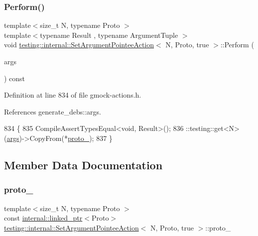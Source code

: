 \subsubsection{\texorpdfstring{Perform()}{Perform()}}
{\footnotesize\ttfamily template$<$size\+\_\+t N, typename Proto $>$ \\
template$<$typename Result , typename Argument\+Tuple $>$ \\
void \hyperlink{classtesting_1_1internal_1_1SetArgumentPointeeAction}{testing\+::internal\+::\+Set\+Argument\+Pointee\+Action}$<$ N, Proto, true $>$\+::Perform (\begin{DoxyParamCaption}\item[{const Argument\+Tuple \&}]{args }\end{DoxyParamCaption}) const\hspace{0.3cm}{\ttfamily [inline]}}



Definition at line 834 of file gmock-\/actions.\+h.



References generate\+\_\+debs\+::args.


\begin{DoxyCode}
834                                                 \{
835     CompileAssertTypesEqual<void, Result>();
836     ::testing::get<N>(\hyperlink{namespacegenerate__debs_a75f9143e38df82d83b2e8a6f99cae02c}{args})->CopyFrom(*\hyperlink{classtesting_1_1internal_1_1SetArgumentPointeeAction_3_01N_00_01Proto_00_01true_01_4_aef9287aad8516bfec6cbcf63807c6c87}{proto\_});
837   \}
\end{DoxyCode}


\subsection{Member Data Documentation}
\mbox{\label{classtesting_1_1internal_1_1SetArgumentPointeeAction_3_01N_00_01Proto_00_01true_01_4_aef9287aad8516bfec6cbcf63807c6c87}} 
\subsubsection{\texorpdfstring{proto\+\_\+}{proto\_}}
{\footnotesize\ttfamily template$<$size\+\_\+t N, typename Proto $>$ \\
const \hyperlink{classtesting_1_1internal_1_1linked__ptr}{internal\+::linked\+\_\+ptr}$<$Proto$>$ \hyperlink{classtesting_1_1internal_1_1SetArgumentPointeeAction}{testing\+::internal\+::\+Set\+Argument\+Pointee\+Action}$<$ N, Proto, true $>$\+::proto\+\_\+\hspace{0.3cm}{\ttfamily [private]}}



